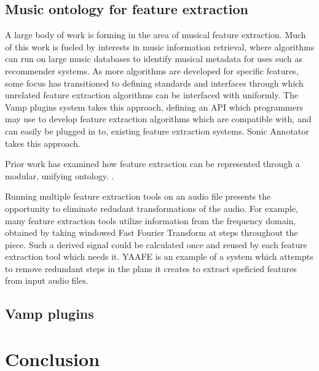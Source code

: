 \documentclass[11pt,conference,letterpaper]{IEEEtran}
\begin{document}
\subsection{Music ontology for feature extraction}

A large body of work is forming in the area of musical feature extraction. Much of this work is fueled by interests in music information retrieval, where algorithms can run on large music databases to identify musical metadata for uses such as recommender systems. As more algorithms are developed for specific features, some focus has transitioned to defining standards and interfaces through which unrelated feature extraction algorithms can be interfaced with uniformly. The Vamp plugins system takes this approach, defining an API which programmers may use to develop feature extraction algorithms which are compatible with, and can easily be plugged in to, existing feature extraction systems. Sonic Annotator takes this approach.

Prior work has examined how feature extraction can be represented through a modular, unifying ontology. \cite{raimond2008web}.

Running multiple feature extraction tools on an audio file presents the opportunity to eliminate redudant transformations of the audio. For example, many feature extraction tools utilize information from the frequency domain, obtained by taking windowed Fast Fourier Transform at steps throughout the piece. Such a derived signal could be calculated once and reused by each feature extraction tool which needs it. YAAFE \cite{mathieu2010yaafe} is an example of a system which attempts to remove redundant steps in the plans it creates to extract speficied features from input audio files.

\subsection{Vamp plugins}

\section{Conclusion}



\end{document}
